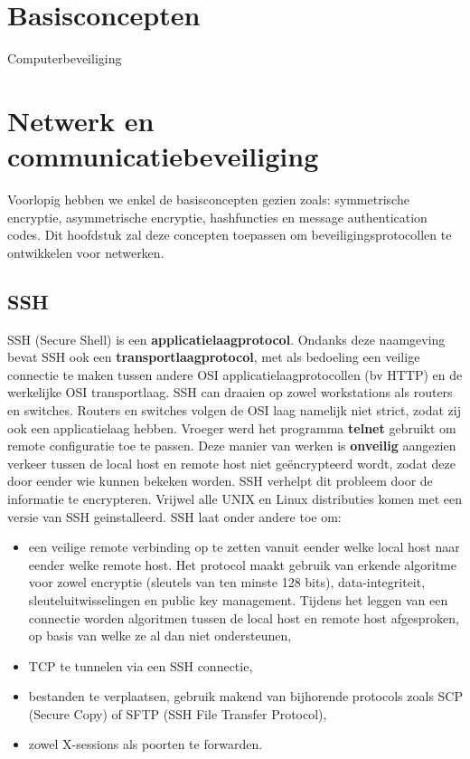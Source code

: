 \documentclass{report}
\begin{document}
	\tableofcontents
	\chapter{Basisconcepten}
	Computerbeveiliging 
	
	\chapter{Netwerk en communicatiebeveiliging}
	Voorlopig hebben we enkel de basisconcepten gezien zoals: symmetrische encryptie, asymmetrische encryptie, hashfuncties en message authentication codes. Dit hoofdstuk zal deze concepten toepassen om beveiligingsprotocollen te ontwikkelen voor netwerken.
	\section{SSH}
	SSH (Secure Shell) is een \textbf{applicatielaagprotocol}. Ondanks deze naamgeving bevat SSH ook een \textbf{transportlaagprotocol}, met als bedoeling een veilige connectie te maken tussen andere OSI applicatielaagprotocollen (bv HTTP) en de werkelijke OSI transportlaag. SSH can draaien op zowel workstations als routers en switches. Routers en switches volgen de OSI laag namelijk niet strict, zodat zij ook een applicatielaag hebben. Vroeger werd het programma \textbf{telnet} gebruikt om remote configuratie toe te passen. Deze manier van werken is \textbf{onveilig} aangezien verkeer tussen de local host en remote host niet geëncrypteerd wordt, zodat deze door eender wie kunnen bekeken worden. SSH verhelpt dit probleem door de informatie te encrypteren. Vrijwel alle UNIX en Linux distributies komen met een versie van SSH geinstalleerd. SSH laat onder andere toe om:
	\begin{itemize}
		\item een veilige remote verbinding op te zetten vanuit eender welke local host naar eender welke remote host. Het protocol maakt gebruik van erkende algoritme voor zowel encryptie (sleutels van ten minste 128 bits), data-integriteit, sleuteluitwisselingen en public key management. Tijdens het leggen van een connectie worden algoritmen tussen de local host en remote host afgesproken, op basis van welke ze al dan niet ondersteunen,
		\item TCP te tunnelen via een SSH connectie,
		\item bestanden te verplaatsen, gebruik makend van bijhorende protocols zoals SCP (Secure Copy) of SFTP (SSH File Transfer Protocol),
		\item zowel X-sessions als poorten te forwarden.
	\end{itemize}
\end{document}
